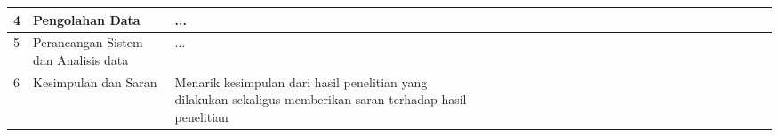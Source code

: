 \documentclass[oneside,listof=totoc]{scrbook}
\begin{document}
\begin{table}
\begin{minipage}{\textwidth}
\begin{longtable}{|l|p{3.0cm}|p{4.5cm}|l|l|l|l|l|l|l|l|l|l|l|l|l|l|l|l|l|l|l|l|l|l|l|l|}
  4 & Pengolahan Data & ... &  &  &  &  &  &  &  &  & \cellcolor[HTML]{5B9BD5} & \cellcolor[HTML]{5B9BD5} & \cellcolor[HTML]{5B9BD5} & \cellcolor[HTML]{5B9BD5} &  &  &  &  &  &  &  &  &  &  &  & \\ \hline
  5 & Perancangan Sistem dan Analisis data & ... &  &  &  &  &  &  &  &  &  &  &  &  & \cellcolor[HTML]{5B9BD5} & \cellcolor[HTML]{5B9BD5} & \cellcolor[HTML]{5B9BD5} & \cellcolor[HTML]{5B9BD5} & \cellcolor[HTML]{5B9BD5} & \cellcolor[HTML]{5B9BD5} & \cellcolor[HTML]{5B9BD5} & \cellcolor[HTML]{00FFFF} & \cellcolor[HTML]{00FFFF} & \cellcolor[HTML]{00FFFF} &  & \\ \hline
  6 & Kesimpulan dan Saran & Menarik kesimpulan dari hasil penelitian yang dilakukan sekaligus memberikan saran terhadap hasil penelitian &  &  &  &  &  &  &  &  &  &  &  &  &  &  &  &  &  &  &  &  &  &  & \cellcolor[HTML]{00FFFF} & \cellcolor[HTML]{00FFFF} \\ \hline
  \end{longtable}
\end{minipage}
\end{table}
\end{document}
